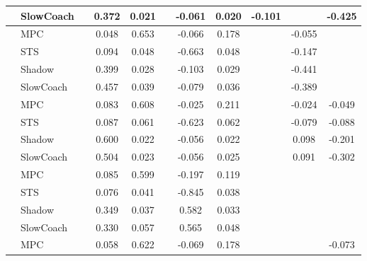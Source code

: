 \begin{tabular}{|l|l|*{9}{c|}}
                                                           & SlowCoach &       &     0.372 &     0.021 &     & -0.061 &  0.020 &  -0.101 &      &   -0.425 \\
\midrule
[False, True, True, False, True, True, False, True, False] & MPC &       &     0.048 &     0.653 &     & -0.066 &  0.178 &      &  -0.055 &       \\
                                                           & STS &       &     0.094 &     0.048 &     & -0.663 &  0.048 &      &  -0.147 &       \\
                                                           & Shadow &       &     0.399 &     0.028 &     & -0.103 &  0.029 &      &  -0.441 &       \\
                                                           & SlowCoach &       &     0.457 &     0.039 &     & -0.079 &  0.036 &      &  -0.389 &       \\
\midrule
[False, True, True, False, True, True, False, True, True] & MPC &       &     0.083 &     0.608 &     & -0.025 &  0.211 &      &  -0.024 &   -0.049 \\
                                                           & STS &       &     0.087 &     0.061 &     & -0.623 &  0.062 &      &  -0.079 &   -0.088 \\
                                                           & Shadow &       &     0.600 &     0.022 &     & -0.056 &  0.022 &      &   0.098 &   -0.201 \\
                                                           & SlowCoach &       &     0.504 &     0.023 &     & -0.056 &  0.025 &      &   0.091 &   -0.302 \\
\midrule
[False, True, True, False, True, True, False, False, False] & MPC &       &     0.085 &     0.599 &     & -0.197 &  0.119 &      &      &       \\
                                                           & STS &       &     0.076 &     0.041 &     & -0.845 &  0.038 &      &      &       \\
                                                           & Shadow &       &     0.349 &     0.037 &     &  0.582 &  0.033 &      &      &       \\
                                                           & SlowCoach &       &     0.330 &     0.057 &     &  0.565 &  0.048 &      &      &       \\
\midrule
[False, True, True, False, True, True, False, False, True] & MPC &       &     0.058 &     0.622 &     & -0.069 &  0.178 &      &      &   -0.073 \\

\end{tabular}
